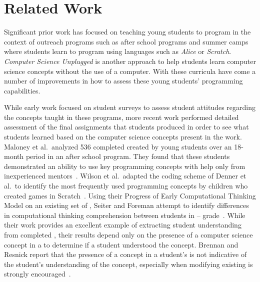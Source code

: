 \section{Related Work}
Significant prior work has focused on teaching young students to program in the
context of outreach programs such as after school programs and summer camps
where students learn to program using languages such as \emph{Alice} or
\emph{Scratch}. \emph{Computer Science Unplugged} is another approach to help
students learn computer science concepts without the use of a computer. With
these curricula have come a number of improvements in how to assess these young
students’ programming capabilities.

While early work focused on student surveys to assess student attitudes
regarding the concepts taught in these programs, more recent work performed
detailed assessment of the final assignments that students produced in order to
see what students learned based on the computer science concepts present in the
work. Maloney et al.\ analyzed 536 completed  created by young
students over an 18-month period in an after school program. They found that
these students demonstrated an ability to use key programming concepts with
help only from inexperienced
mentors~\cite{Maloney:2008:PCU:1352135.1352260}. Wilson et al.\ adapted the
coding scheme of Denner et al.\ to identify the most frequently used
programming concepts by children who created games in
Scratch~\cite{Denner:2012:CGC:2072695.2073050, wilson12}. Using their Progress
of Early Computational Thinking Model on an existing set of ,
Seiter and Foreman attempt to identify differences in computational thinking
comprehension between students in --
grade~\cite{Seiter:2013:MLP:2493394.2493403}. While their work provides an
excellent example of extracting student understanding from completed
, their results depend only on the presence of a computer science
concept in a \sprogram{} to determine if a student understood the
concept. Brennan and Resnick report that the presence of a concept in a
student's \sprogram{} is not indicative of the student's understanding of the
concept, especially when modifying existing  is strongly
encouraged~\cite{brennan12}.

